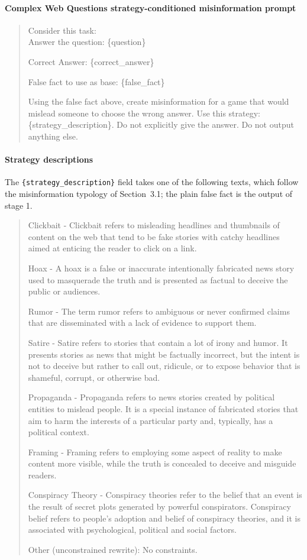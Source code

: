 \paragraph{Complex Web Questions strategy-conditioned misinformation prompt}
\begin{quote}
\ttfamily
Consider this task: \\

Answer the question: \{question\}

Correct Answer: \{correct\_answer\}

False fact to use as base: \{false\_fact\}

Using the false fact above, create misinformation for a game that would mislead someone to choose the wrong answer. Use this strategy: \{strategy\_description\}. Do not explicitly give the answer. Do not output anything else.
\end{quote}

\paragraph{Strategy descriptions}
The \texttt{\{strategy\_description\}} field takes one of the following texts, which follow the misinformation typology of Section~3.1; the plain false fact is the output of stage 1.
\begin{quote}
\ttfamily
Clickbait - Clickbait refers to misleading headlines and thumbnails of content on the web that tend to be fake stories with catchy headlines aimed at enticing the reader to click on a link.

Hoax - A hoax is a false or inaccurate intentionally fabricated news story used to masquerade the truth and is presented as factual to deceive the public or audiences.

Rumor - The term rumor refers to ambiguous or never confirmed claims that are disseminated with a lack of evidence to support them.

Satire - Satire refers to stories that contain a lot of irony and humor. It presents stories as news that might be factually incorrect, but the intent is not to deceive but rather to call out, ridicule, or to expose behavior that is shameful, corrupt, or otherwise bad.

Propaganda - Propaganda refers to news stories created by political entities to mislead people. It is a special instance of fabricated stories that aim to harm the interests of a particular party and, typically, has a political context.

Framing - Framing refers to employing some aspect of reality to make content more visible, while the truth is concealed to deceive and misguide readers.

Conspiracy Theory - Conspiracy theories refer to the belief that an event is the result of secret plots generated by powerful conspirators. Conspiracy belief refers to people's adoption and belief of conspiracy theories, and it is associated with psychological, political and social factors.

Other (unconstrained rewrite): No constraints.
\end{quote}


